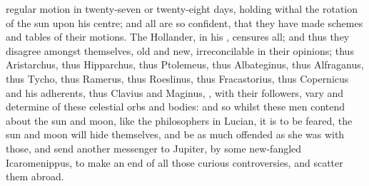 {regular motion in twenty-seven or twenty-eight days, holding withal the rotation of the sun upon his centre; and all are so confident, that they have made schemes and tables of their motions. The Hollander, in his , censures all; and thus they disagree amongst themselves, old and new, irreconcilable in their opinions; thus Aristarchus, thus Hipparchus, thus Ptolemeus, thus Albateginus, thus Alfraganus, thus Tycho, thus Ramerus, thus Roeslinus, thus Fracastorius, thus Copernicus and his adherents, thus Clavius and Maginus, \etc{}, with their followers, vary and determine of these celestial orbs and bodies: and so whilst these men contend about the sun and moon, like the philosophers in Lucian, it is to be feared, the sun and moon will hide themselves, and be as much offended as she was with those, and send another messenger to Jupiter, by some new-fangled Icaromenippus, to make an end of all those curious controversies, and scatter them abroad.

}
